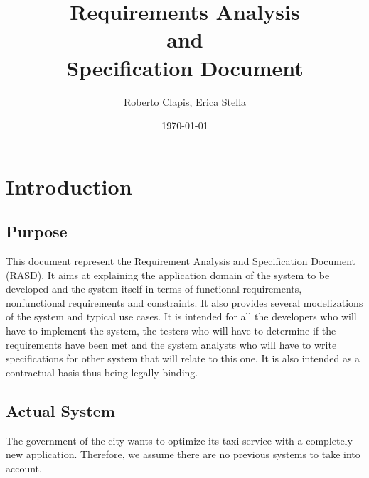 \documentclass{article}
\author{Roberto Clapis, Erica Stella}
\date{\today}
\title{Requirements Analysis \\ and \\ Specification Document}
\begin{document}
\maketitle
\tableofcontents
\clearpage

\section{Introduction}

\subsection{Purpose}
This document represent the Requirement Analysis and Speciﬁcation Document (RASD). It aims at explaining the application domain of the system to be developed and the system itself in terms of functional requirements, nonfunctional requirements and constraints. It also provides several modelizations of the system and typical use cases. It is intended for all the developers who will have to implement the system, the testers who will have to determine if the requirements have been met and the system analysts who will have to write specifications for other system that will relate to this one. It is also intended as a contractual basis thus being legally binding.

\subsection{Actual System}
The government of the city wants to optimize its taxi service with a completely new application. Therefore, we assume there are no previous systems to take into account.
\end{document}
